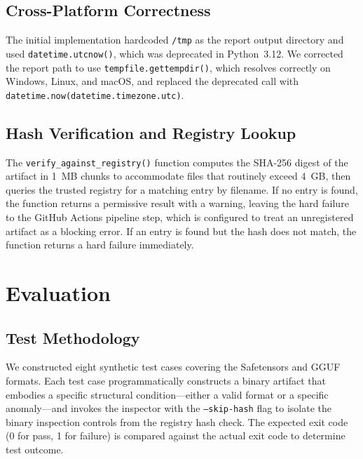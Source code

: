 \documentclass[sigconf,review]{acmart}
\begin{document}
\subsection{Cross-Platform Correctness}

The initial implementation hardcoded \texttt{/tmp} as the report output
directory and used \texttt{datetime.utcnow()}, which was deprecated in
Python~3.12. We corrected the report path to use \texttt{tempfile.gettempdir()},
which resolves correctly on Windows, Linux, and macOS, and replaced the
deprecated call with \texttt{datetime.now(datetime.timezone.utc)}.

\subsection{Hash Verification and Registry Lookup}

The \texttt{verify\_against\_registry()} function computes the SHA-256
digest of the artifact in 1~MB chunks to accommodate files that routinely
exceed 4~GB, then queries the trusted registry for a matching entry by
filename. If no entry is found, the function returns a permissive result
with a warning, leaving the hard failure to the GitHub Actions pipeline
step, which is configured to treat an unregistered artifact as a blocking
error. If an entry is found but the hash does not match, the function
returns a hard failure immediately.

\section{Evaluation}
\label{sec:eval}

\subsection{Test Methodology}

We constructed eight synthetic test cases covering the Safetensors and GGUF
formats. Each test case programmatically constructs a binary artifact that
embodies a specific structural condition---either a valid format or a
specific anomaly---and invokes the inspector with the \texttt{--skip-hash}
flag to isolate the binary inspection controls from the registry hash check.
The expected exit code (0 for pass, 1 for failure) is compared against the
actual exit code to determine test outcome.
\end{document}
